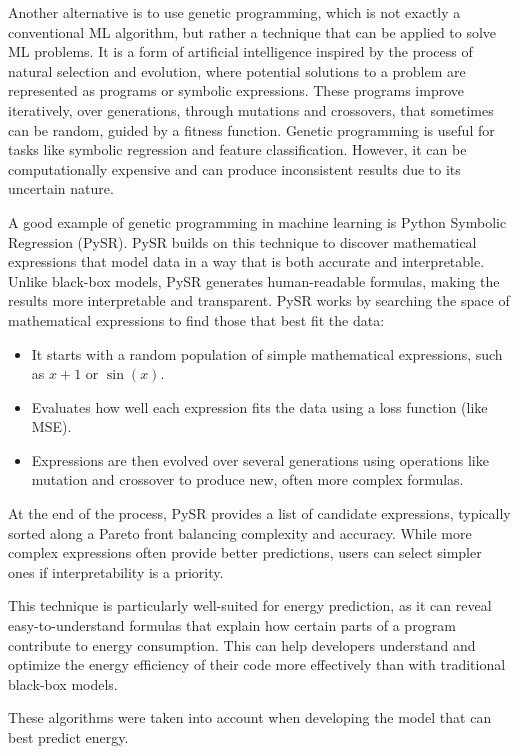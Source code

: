 Another alternative is to use genetic programming, which is not exactly a conventional ML algorithm, but rather a technique that can be applied to solve ML problems. It is a form of artificial intelligence inspired by the process of natural selection and evolution, where potential solutions to a problem are represented as programs or symbolic expressions. These programs improve iteratively, over generations, through mutations and crossovers, that sometimes can be random, guided by a fitness function. Genetic programming is useful for tasks like symbolic regression and feature classification. However, it can be computationally expensive and can produce inconsistent results due to its uncertain nature.
{\color{blue}
A good example of genetic programming in machine learning is Python Symbolic Regression (PySR). PySR builds on this technique to discover mathematical expressions that model data in a way that is both accurate and interpretable. Unlike black-box models, PySR generates human-readable formulas, making the results more interpretable and transparent.
PySR works by searching the space of mathematical expressions to find those that best fit the data:

\begin{itemize}
    \item It starts with a random population of simple mathematical expressions, such as $x + 1$ or $\sin(x)$.
    \item Evaluates how well each expression fits the data using a loss function (like MSE).
    \item Expressions are then evolved over several generations using operations like mutation and crossover to produce new, often more complex formulas.
\end{itemize}

At the end of the process, PySR provides a list of candidate expressions, typically sorted along a Pareto front balancing complexity and accuracy. While more complex expressions often provide better predictions, users can select simpler ones if interpretability is a priority.

This technique is particularly well-suited for energy prediction, as it can reveal easy-to-understand formulas that explain how certain parts of a program contribute to energy consumption. This can help developers understand and optimize the energy efficiency of their code more effectively than with traditional black-box models.

These algorithms were taken into account when developing the model that can best predict energy.
}

